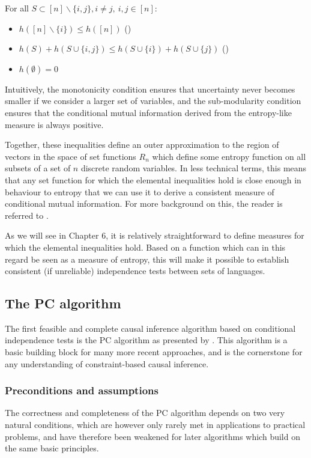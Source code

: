 For all $S \subset [n] \backslash \{i,j\}, i \neq j,\ i,j \in [n]$:
\begin{itemize}
 \item $h([n] \backslash \{i\}) \leq h([n])$ ()
 \item $h(S) + h(S \cup \{i,j\}) \leq h(S \cup \{i\}) + h(S \cup \{j\})$ ()
 \item $h(\emptyset) = 0$
\end{itemize}
Intuitively, the monotonicity condition ensures that uncertainty never becomes smaller if we consider a larger set of variables, and the sub-modularity condition ensures that the conditional mutual information derived from the entropy-like measure is always positive.

Together, these inequalities define an outer approximation to the region of vectors in the space of set functions $R_n$ which define some entropy function on all subsets of a set of $n$ discrete random variables. In less technical terms, this means that any set function for which the elemental inequalities hold is close enough in behaviour to entropy that we can use it to derive a consistent measure of conditional mutual information. For more background on this, the reader is referred to \citet[Ch. 14]{yeung2008}.

As we will see in Chapter 6, it is relatively straightforward to define measures for which the elemental inequalities hold. Based on a function which can in this regard be seen as a measure of entropy, this will make it possible to establish consistent (if unreliable) independence tests between sets of languages.

\subsection{The PC algorithm}
The first feasible and complete causal inference algorithm based on conditional independence tests is the PC algorithm as presented by \cite{spirtes_ea_2000}. This algorithm is a basic building block for many more recent approaches, and is the cornerstone for any understanding of constraint-based causal inference.

\subsubsection{Preconditions and assumptions}
The correctness and completeness of the PC algorithm depends on two very natural conditions, which are however only rarely met in applications to practical problems, and have therefore been weakened for later algorithms which build on the same basic principles.

